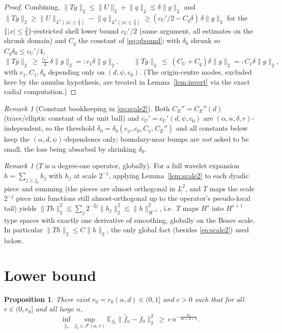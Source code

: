 \documentclass[11pt]{article}
\newtheorem{proposition}[theorem]{Proposition}
\theoremstyle{remark}
\newtheorem{remark}[theorem]{Remark}
\newcommand{\E}{\mathbb{E}}
\newcommand{\F}{\mathcal{F}}
\newcommand{\norm}[1]{\lVert #1\rVert}
\newcommand{\abs}[1]{\lvert #1\rvert}
\newcommand{\SET}[1]{\{#1\}}
\begin{document}
\begin{proof}
\smallskip
\noindent Combining,
$\norm{Tg}_2\le\norm{U}_2+\norm{q}_2\lesssim\delta\norm g_2$ and
$\norm{Tg}_2\ge\norm{U}_{L^{2}(\abs x\le\frac34)}-\norm{q}_{L^{2}(\abs
x\le\frac34)}\ge(c_U'/2-C_q\delta)\,\delta\norm g_2$ for the
$\SET{\abs x\le\frac34}$-restricted shell lower bound $c_U'/2$ (same
argument, all estimates on the shrunk domain) and $C_q$ the constant of
\eqref{eq:qbound}; with $\delta_0$ shrunk so $C_q\delta_0\le c_U'/4$,
\[
\norm{Tg}_2\ \ge\ \tfrac{c_U'}4\,\delta\norm g_2 =:c_1\delta\norm g_2,
\qquad
\norm{Tg}_2\ \le\ (C_U+C_q)\delta\norm g_2=:C_1\delta\norm g_2 ,
\]
with $c_1,C_1,\delta_0$ depending only on $(d,\psi,c_0)$. (The
origin-centre modes, excluded here by the annulus hypothesis, are
treated in Lemma~\ref{lem:invert} via the exact radial computation.)
\end{proof}

\begin{remark}[Constant bookkeeping in \eqref{eq:scale2}]\label{rem:const}
Both $C_E''=C_E''(d)$ (trace/elliptic constant of the unit ball) and
$c_U'=c_U'(d,\psi,c_0)$ are $(\alpha,n,\delta,r)$-independent, so the
threshold $\delta_0=\delta_0(c_\psi,c_0,C_\psi,C_E'')$ and all constants
below keep the $(\alpha,d,\psi)$-dependence only; boundary-near bumps are
\emph{not} asked to be small, the loss being absorbed by shrinking
$\delta_0$.
\end{remark}

\begin{remark}[$T$ is a degree-one operator, globally]\label{rem:degree1}
For a full wavelet expansion $h=\sum_{j\ge j_0}h_j$ with $h_j$ at scale
$2^{-j}$, applying Lemma~\ref{lem:scale2} to each dyadic piece and summing
(the pieces are almost orthogonal in $L^2$, and $T$ maps the scale
$2^{-j}$ piece into functions still almost-orthogonal up to the operator's
pseudo-local tail) yields
$\norm{Th}_2^{2}\lesssim\sum_j 2^{-2j}\norm{h_j}_2^{2}
\lesssim\norm{h}_{H^{-1}}^{2}$, i.e.\ $T$ maps $H^{s}$ into $H^{s+1}$ type
spaces with exactly one derivative of smoothing, globally on the Besov
scale. In particular $\norm{Th}_2\le C\norm{h}_2$, the only global fact
(besides \eqref{eq:scale2}) used below.
\end{remark}

\section{Lower bound}\label{sec:lower}

\begin{proposition}\label{prop:lower}
There exist $r_0=r_0(\alpha,d)\in(0,1]$ and $c>0$ such that for all
$r\in(0,r_0]$ and all large $n$,
\[
\inf_{\widehat f_n}\sup_{f_0\in\F(\alpha,r)}
\E_{f_0}\norm{\widehat f_n-f_0}_{2}^{2}\ \ge\ c\,n^{-\frac{2\alpha}{2\alpha+d+2}} .
\]
\end{proposition}
\end{document}
